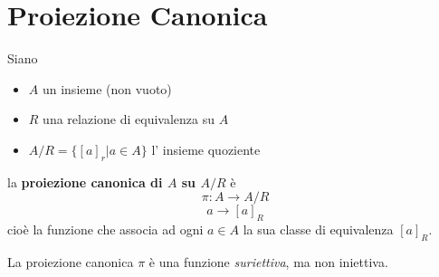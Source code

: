 \documentclass[a4paper,12pt, oneside]{book}
\begin{document}
\section{Proiezione Canonica}
\begin{definizione}
	Siano \begin{itemize}
		\item $A$ un insieme (non vuoto)
		\item $R$ una relazione di equivalenza su $A$
		\item $A/R = \{ [a]_{r} | a \in A \}$ l' insieme quoziente
	\end{itemize}
	la \textbf{\textbf{proiezione canonica di $A$ su $A/R$}} è $$\pi : A \longrightarrow A/R$$ $$a \longrightarrow [a]_{R}$$ cioè la funzione che associa ad ogni $a \in A$ la sua classe di equivalenza $[a]_{R}$.
\end{definizione}
\begin{nota}
	La proiezione canonica $\pi$ è una funzione \textit{suriettiva}, ma non iniettiva.
\end{nota}
\end{document}

